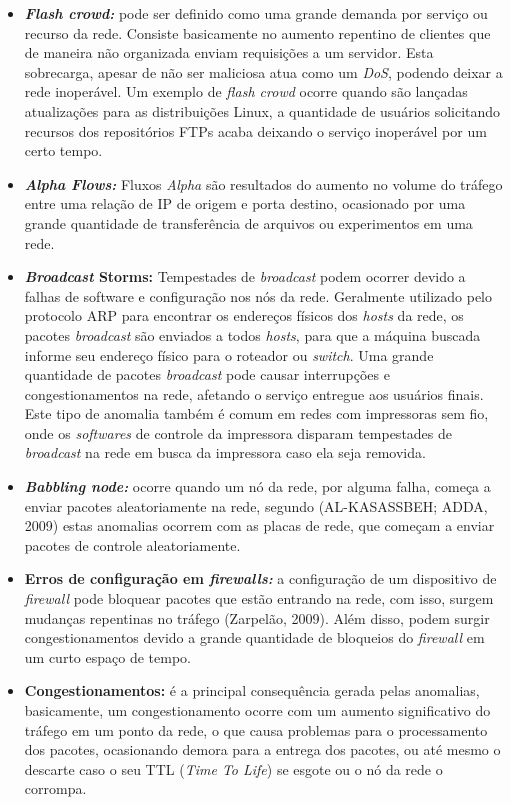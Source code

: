 \documentclass[12pt,openright,oneside,a4paper,english,spanish,brazil]{unifil}
\begin{document}
\begin{itemize}
  \item \textbf{\textit{Flash crowd:}} pode ser definido como uma grande demanda por serviço ou recurso da rede. Consiste basicamente no aumento repentino de clientes que de maneira não organizada enviam requisições a um servidor. Esta sobrecarga, apesar de não ser maliciosa atua como um \textit{DoS}, podendo deixar a rede inoperável. Um exemplo de \textit{flash crowd} ocorre quando são lançadas atualizações para as distribuições Linux, a quantidade de usuários solicitando recursos dos repositórios FTPs acaba deixando o serviço inoperável por um certo tempo.
  \item \textbf{\textit{Alpha Flows:}} Fluxos \textit{Alpha} são resultados do aumento no volume do tráfego entre uma relação de IP de origem e porta destino, ocasionado por uma grande quantidade de transferência de arquivos ou experimentos em uma rede.
  \item \textbf{\textit{Broadcast} Storms:} Tempestades de \textit{broadcast} podem ocorrer devido a falhas de software e configuração nos nós da rede. Geralmente utilizado pelo protocolo ARP para encontrar os endereços físicos dos \textit{hosts} da rede, os pacotes \textit{broadcast} são enviados a todos \textit{hosts}, para que a máquina buscada informe seu endereço físico para o roteador ou \textit{switch}. Uma grande quantidade de pacotes \textit{broadcast}  pode causar interrupções e congestionamentos na rede, afetando o serviço entregue aos usuários finais. Este tipo de anomalia também é comum em redes com impressoras sem fio, onde os \textit{softwares} de controle da impressora disparam tempestades de \textit{broadcast} na rede em busca da impressora caso ela seja removida.
  \item \textbf{\textit{Babbling node:}} ocorre quando um nó da rede, por alguma falha, começa a enviar pacotes aleatoriamente na rede, segundo (AL-KASASSBEH; ADDA, 2009) estas anomalias ocorrem com as placas de rede, que começam a enviar pacotes de controle aleatoriamente.
  \item \textbf{Erros de configuração em \textit{firewalls:}} a configuração de um dispositivo de \textit{firewall} pode bloquear pacotes que estão entrando na rede, com isso, surgem mudanças repentinas no tráfego (Zarpelão, 2009). Além disso, podem surgir congestionamentos devido a grande quantidade de bloqueios do \textit{firewall} em um curto espaço de tempo.
  \item \textbf{Congestionamentos:} é a principal consequência gerada pelas anomalias, basicamente, um congestionamento ocorre com um aumento significativo do tráfego em um ponto da rede, o que causa problemas para o processamento dos pacotes, ocasionando demora para a entrega dos pacotes, ou até mesmo o descarte caso o seu TTL (\textit{Time To Life}) se esgote ou o nó da rede o corrompa.
\end{itemize}
\end{document}
